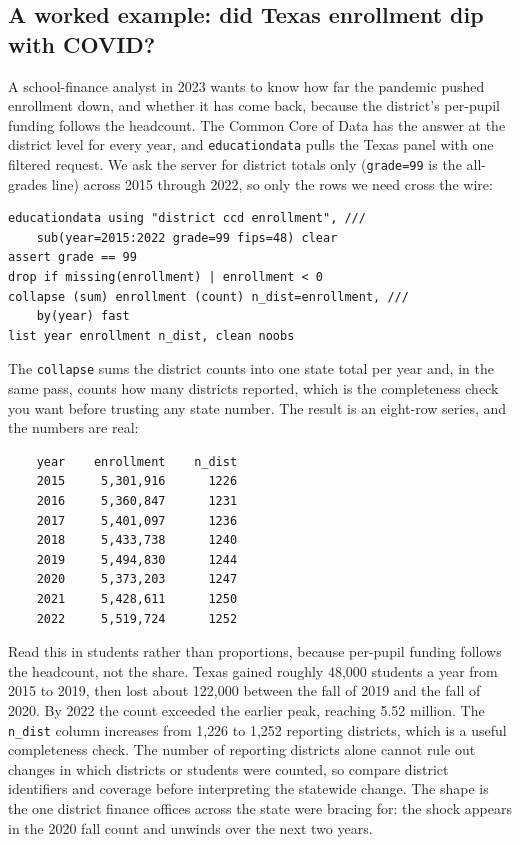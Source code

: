 \documentclass[
    a4paper,
    fontsize=10pt,
    twoside=true,
    numbers=noenddot,
]{kaobook}
\begin{document}
\subsection{A worked example: did Texas enrollment dip with COVID?}\label{sec:ccd}
A school-finance analyst in 2023 wants to know how far the pandemic pushed enrollment down, and whether it has come back, because the district's per-pupil funding follows the headcount. The Common Core of Data has the answer at the district level for every year, and \texttt{educationdata} pulls the Texas panel with one filtered request. We ask the server for district totals only (\texttt{grade=99} is the all-grades line) across 2015 through 2022, so only the rows we need cross the wire:
\par
{\footnotesize
\begin{verbatim}
educationdata using "district ccd enrollment", ///
    sub(year=2015:2022 grade=99 fips=48) clear
assert grade == 99
drop if missing(enrollment) | enrollment < 0
collapse (sum) enrollment (count) n_dist=enrollment, ///
    by(year) fast
list year enrollment n_dist, clean noobs
\end{verbatim}
}
The \texttt{collapse} sums the district counts into one state total per year and, in the same pass, counts how many districts reported, which is the completeness check you want before trusting any state number. The result is an eight-row series, and the numbers are real:
\par
{\footnotesize
\begin{verbatim}
    year    enrollment    n_dist
    2015     5,301,916      1226
    2016     5,360,847      1231
    2017     5,401,097      1236
    2018     5,433,738      1240
    2019     5,494,830      1244
    2020     5,373,203      1247
    2021     5,428,611      1250
    2022     5,519,724      1252
\end{verbatim}
}
Read this in students rather than proportions, because per-pupil funding follows the headcount, not the share. Texas gained roughly 48{,}000 students a year from 2015 to 2019, then lost about 122{,}000 between the fall of 2019 and the fall of 2020. By 2022 the count exceeded the earlier peak, reaching 5.52 million. The \texttt{n\_dist} column increases from 1{,}226 to 1{,}252 reporting districts, which is a useful completeness check. The number of reporting districts alone cannot rule out changes in which districts or students were counted, so compare district identifiers and coverage before interpreting the statewide change. The shape is the one district finance offices across the state were bracing for: the shock appears in the 2020 fall count and unwinds over the next two years.
\end{document}
